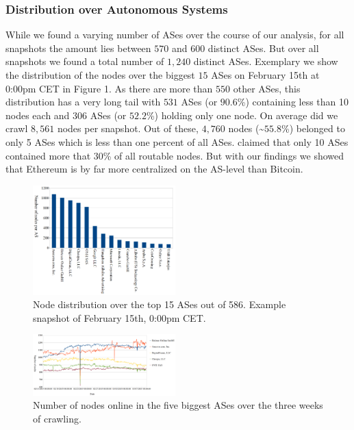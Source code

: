 \documentclass[10pt,conference,final]{IEEEtran}
\begin{document}
\subsubsection{Distribution over Autonomous Systems}
\label{sec:RAS}
While we found a varying number of ASes over the course of our analysis, for all snapshots the amount lies between $570$ and $600$ distinct ASes.
But over all snapshots we found a total number of $1,240$ distinct ASes.
Exemplary we show the distribution of the nodes over the biggest $15$ ASes on February 15th at 0:00pm CET in Figure 1.
As there are more than $550$ other ASes, this distribution has a very long tail with $531$ ASes (or $90.6$\%) containing less than 10 nodes each and $306$ ASes (or $52.2$\%) holding only one node.
On average did we crawl $8,561$ nodes per snapshot.
Out of these, $4,760$ nodes (\textasciitilde$55.8$\%) belonged to only 5 ASes which is less than one percent of all ASes.
\cite{36} claimed that only 10 ASes contained more that 30\% of all routable nodes.
But with our findings we showed that Ethereum is by far more centralized on the AS-level than Bitcoin.

\begin{figure}[!t]
\label{fig:1}
\centering
\includegraphics[width=0.49\textwidth]{./Pictures/ASdistribution.png}
\caption{Node distribution over the top 15 ASes out of 586. Example snapshot of February 15th, 0:00pm CET.}
\end{figure}

\begin{figure}[!t]
\label{fig:2}
\centering
\includegraphics[width=0.49\textwidth]{./Pictures/ASdistribution1.png}
\caption{Number of nodes online in the five biggest ASes over the three weeks of crawling.}
\end{figure}
\end{document}
